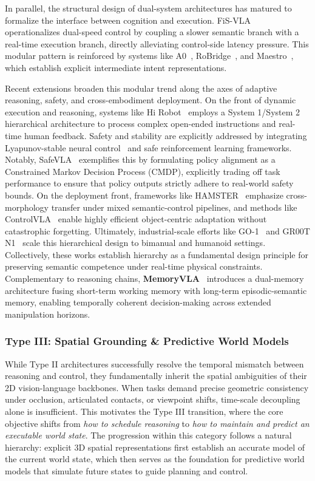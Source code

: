 \documentclass[acmsmall,screen,review,anonymous]{acmart}
\begin{document}
In parallel, the structural design of dual-system architectures has matured to formalize the interface between cognition and execution. FiS-VLA~\cite{chen2025fis} operationalizes dual-speed control by coupling a slower semantic branch with a real-time execution branch, directly alleviating control-side latency pressure. This modular pattern is reinforced by systems like A0~\cite{xu2025a0}, RoBridge~\cite{zhang2025robridge}, and Maestro~\cite{shi2025maestro}, which establish explicit intermediate intent representations. 

Recent extensions broaden this modular trend along the axes of adaptive reasoning, safety, and cross-embodiment deployment. On the front of dynamic execution and reasoning, systems like Hi Robot~\cite{shi2025hirobot} employs a System 1/System 2 hierarchical architecture to process complex open-ended instructions and real-time human feedback. Safety and stability are explicitly addressed by integrating Lyapunov-stable neural control~\cite{yang2024lyapunov} and safe reinforcement learning frameworks. Notably, SafeVLA~\cite{zhang2025safevla} exemplifies this by formulating policy alignment as a Constrained Markov Decision Process (CMDP), explicitly trading off task performance to ensure that policy outputs strictly adhere to real-world safety bounds. On the deployment front, frameworks like HAMSTER~\cite{li2025hamster} emphasize cross-morphology transfer under mixed semantic-control pipelines, and methods like ControlVLA~\cite{li2025controlvla} enable highly efficient object-centric adaptation without catastrophic forgetting. Ultimately, industrial-scale efforts like GO-1~\cite{agibot2025} and GR00T N1~\cite{nvidia2025grootn1} scale this hierarchical design to bimanual and humanoid settings. Collectively, these works establish hierarchy as a fundamental design principle for preserving semantic competence under real-time physical constraints. Complementary to reasoning chains, \textbf{MemoryVLA}~\cite{shi2026memoryvla} introduces a dual-memory architecture fusing short-term working memory with long-term episodic-semantic memory, enabling temporally coherent decision-making across extended manipulation horizons.

\subsubsection{Type III\@: Spatial Grounding \& Predictive World Models}

While Type II architectures successfully resolve the temporal mismatch between reasoning and control, they fundamentally inherit the spatial ambiguities of their 2D vision-language backbones. When tasks demand precise geometric consistency under occlusion, articulated contacts, or viewpoint shifts, time-scale decoupling alone is insufficient. This motivates the Type III transition, where the core objective shifts from \emph{how to schedule reasoning} to \emph{how to maintain and predict an executable world state}. The progression within this category follows a natural hierarchy: explicit 3D spatial representations first establish an accurate model of the current world state, which then serves as the foundation for predictive world models that simulate future states to guide planning and control.
\end{document}
